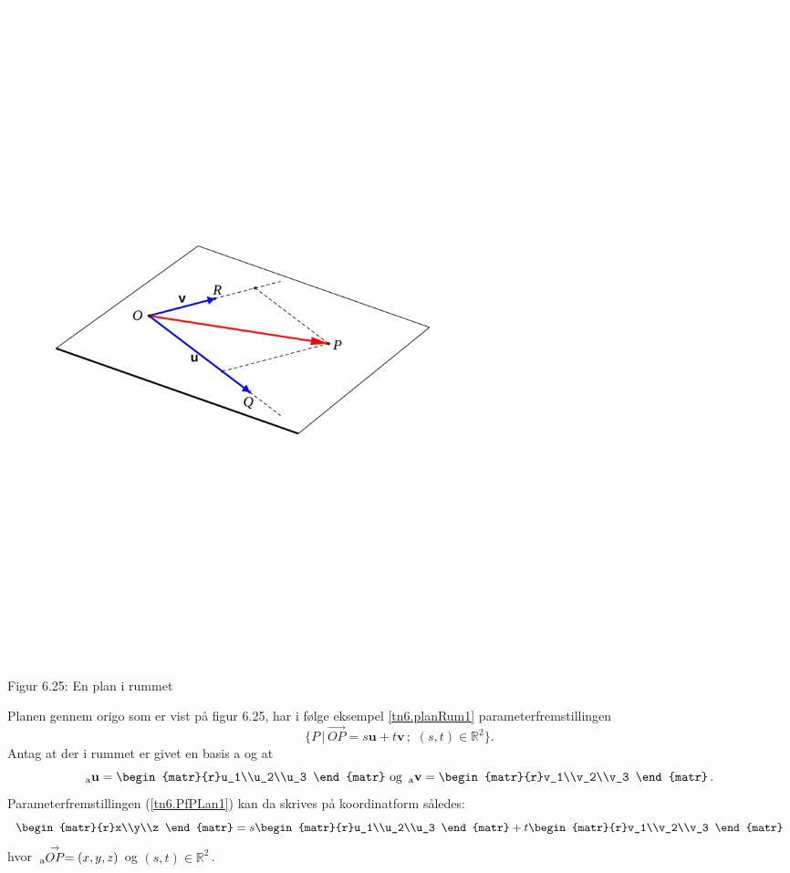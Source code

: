 \begin{example}\label{planParamKoord}
\begin{center}
		\includegraphics[trim=1.5cm 10.5cm 1.5cm
 10.7cm,width=0.60\textwidth,clip]{geometer/vektor14.pdf}	
   \\Figur 6.25: En plan i rummet	
\end{center}
Planen gennem origo som er vist på figur 6.25, har i følge eksempel \ref{tn6.planRum1} parameterfremstil\-lingen
\begin{equation}\label{tn6.PfPLan1}
\{P\,|\, \stackrel{\rightarrow}{OP}=s\mathbf u+t\mathbf v\,;\,\,(s,t)\in \mathbb R^2\}.
\end{equation}
Antag at der i rummet er givet en basis a og at
$$
{_\mathrm{a}\mathbf{u}}=\begin{matr}{r}u_1\\u_2\\u_3 \end{matr}\,\,\mathrm{og}\,\,\,
{_\mathrm{a}\mathbf{v}}=\begin{matr}{r}v_1\\v_2\\v_3 \end{matr}\,.
$$
Parameterfremstillingen (\ref{tn6.PfPLan1}) kan da skrives på koordinatform således:
\begin{equation}\label{tn6.PfPLanKoord1}
\begin{matr}{r}x\\y\\z \end{matr}=
s\begin{matr}{r}u_1\\u_2\\u_3 \end{matr}+
t\begin{matr}{r}v_1\\v_2\\v_3 \end{matr}
\end{equation}
hvor $\,_\mathrm{a}\hspace{-0.1cm}\stackrel{\rightarrow}{OP}=(x,y,z)$ og $(s,t)\in \mathbb R^2\,$.
\end{example}

